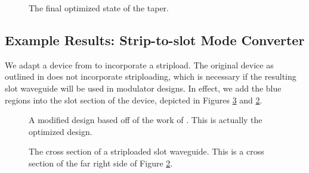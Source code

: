 \documentclass[12pt]{article}
\begin{document}
\begin{figure}
\caption{The final optimized state of the taper.}
\label{fig.toy_taper_example_optimized}
\end{figure}

\subsection{Example Results: Strip-to-slot Mode Converter}
We adapt a device from \cite{deng} to incorporate a stripload. The original device as outlined in \cite{deng} does not incorporate striploading, which is necessary if the resulting slot waveguide will be used in modulator designs. In effect, we add the blue regions into the slot section of the device, depicted in Figures \ref{fig.slot_xs} and \ref{fig.s2s_striploading}.

\begin{figure}
\caption{A modified design based off of the work of \cite{deng}. This is actually the optimized design.}
\label{fig.s2s_striploading}
\end{figure}

\begin{figure}
\caption{The cross section of a striploaded slot waveguide. This is a cross section of the far right side of Figure \ref{fig.s2s_striploading}.}
\label{fig.slot_xs}
\end{figure}
\end{document}
